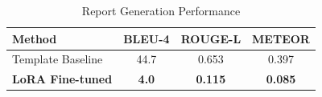 \begin{table}[htbp]
\caption{Report Generation Performance}
\begin{center}
\begin{tabular}{l c c c}
\toprule
\textbf{Method} & \textbf{BLEU-4} & \textbf{ROUGE-L} & \textbf{METEOR} \\
\midrule
Template Baseline & 44.7 & 0.653 & 0.397 \\
\textbf{LoRA Fine-tuned} & \textbf{4.0} & \textbf{0.115} & \textbf{0.085} \\
\bottomrule
\end{tabular}
\label{tab:report_results}
\end{center}
\end{table}